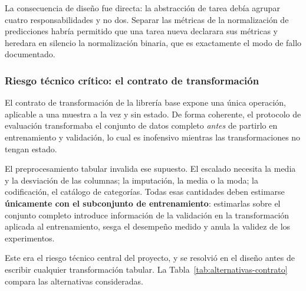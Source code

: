 \documentclass[12pt,letterpaper,oneside]{article}
\begin{document}
La consecuencia de diseño fue directa: la abstracción de tarea debía agrupar cuatro
responsabilidades y no dos. Separar las métricas de la normalización de predicciones
habría permitido que una tarea nueva declarara sus métricas y heredara en silencio la
normalización binaria, que es exactamente el modo de fallo documentado.

\subsubsection{Riesgo técnico crítico: el contrato de transformación}

El contrato de transformación de la librería base expone una única operación, aplicable a
una muestra a la vez y sin estado. De forma coherente, el protocolo de evaluación
transformaba el conjunto de datos completo \emph{antes} de partirlo en entrenamiento y
validación, lo cual es inofensivo mientras las transformaciones no tengan estado.

El preprocesamiento tabular invalida ese supuesto. El escalado necesita la media y la
desviación de las columnas; la imputación, la media o la moda; la codificación, el catálogo
de categorías. Todas esas cantidades deben estimarse \textbf{únicamente con el subconjunto
de entrenamiento}: estimarlas sobre el conjunto completo introduce información de la
validación en la transformación aplicada al entrenamiento, sesga el desempeño medido y
anula la validez de los experimentos.

Este era el riesgo técnico central del proyecto, y se resolvió en el diseño antes de
escribir cualquier transformación tabular. La Tabla~\ref{tab:alternativas-contrato}
compara las alternativas consideradas.
\end{document}

